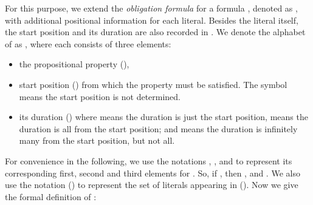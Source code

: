 \documentclass[conference]{IEEEtran}
\begin{document}
For this purpose, we extend the \textit{obligation formula} for a
formula , denoted as , with additional positional
information for each literal. Besides the literal itself, the start
position and its duration are also recorded in . We denote
the alphabet of  as , where
each  consists of three elements:
\begin{itemize}
\item the propositional property (),
\item start position () from which the property must be
  satisfied. The symbol  means the start position is not
  determined.
\item its duration () where  means the duration
  is just the start position,  means the duration is all from
  the start position; and  means the duration is
  infinitely many from the start position, but not all. 
\end{itemize}


For convenience in the following, we use the notations ,
, and  to represent its corresponding first,
second and third elements for . So, if , then ,  and
. We also use the notation  () to represent 
the set of literals appearing in  ().  Now we give the
formal definition of :
\end{document}
